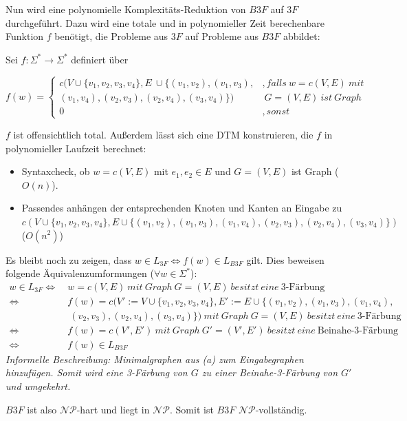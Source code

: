 \begin{teile}
	Nun wird eine polynomielle Komplexitäts-Reduktion von $B3F$ auf $3F$ durchgeführt. Dazu wird eine totale und in polynomieller Zeit berechenbare Funktion $f$ benötigt, die Probleme aus $3F$ auf Probleme aus $B3F$ abbildet:

	Sei $f:\Sigma^*\rightarrow \Sigma^*$ definiert über

	$f(w)= \begin{cases}
		c(V\cup \{v_1,v_2,v_3,v_4\}, E\ \cup \{(v_1,v_2),(v_1,v_3), &, falls\ w=c(V,E)\ mit\\
		(v_1,v_4),(v_2,v_3),(v_2,v_4),(v_3,v_4)\}) &\ G = (V,E)\ ist\ Graph\\
		0 &, sonst
	\end{cases}$
	
	$f$ ist offensichtlich total. Außerdem lässt sich eine DTM konstruieren, die $f$ in polynomieller Laufzeit berechnet:
	\begin{itemize}
		\item Syntaxcheck, ob $w=c(V,E)$ mit $e_1,e_2 \in E$ und $G = (V,E)$ ist Graph ($O(n)$).
		\item Passendes anhängen der entsprechenden Knoten und Kanten an Eingabe zu $c(V \cup \{v_1,v_2,v_3,v_4\}, E \cup \{(v_1,v_2),(v_1,v_3),(v_1,v_4),(v_2,v_3),(v_2,v_4),(v_3,v_4)\})$ ($O(n^2)$)
	\end{itemize}

	Es bleibt noch zu zeigen, dass $w \in L_{3F} \Leftrightarrow f(w) \in L_{B3F}$ gilt. Dies beweisen folgende Äquivalenzumformungen ($\forall w \in \Sigma^*$):
	\begin{align*}
		w \in L_{3F} \Longleftrightarrow\ & w=c(V,E)\ mit\ Graph\ G=(V,E)\ besitzt\ eine\ \text{3-Färbung}\\
		\Leftrightarrow\ & f(w)=c(V':=V \cup \{v_1,v_2,v_3,v_4\}, E':=E \cup \{(v_1,v_2),(v_1,v_3),(v_1,v_4),\\
		&\ (v_2,v_3),(v_2,v_4),(v_3,v_4)\})\ mit\ Graph\ G=(V,E)\ besitzt\ eine\ \text{3-Färbung}\\
		\Leftrightarrow\ & f(w)=c(V', E')\ mit\ Graph\ G'=(V',E')\ besitzt\ eine\ \text{Beinahe-3-Färbung}\\
		\Leftrightarrow\ & f(w) \in L_{B3F}
	\end{align*}
	\textit{Informelle Beschreibung: Minimalgraphen aus (a) zum Eingabegraphen hinzufügen. Somit wird eine 3-Färbung von $G$ zu einer Beinahe-3-Färbung von $G'$ und umgekehrt.}

	$B3F$ ist also $\mathcal{NP}$-hart und liegt in $\mathcal{NP}$. Somit ist $B3F$ $\mathcal{NP}$-vollständig.

\end{teile}